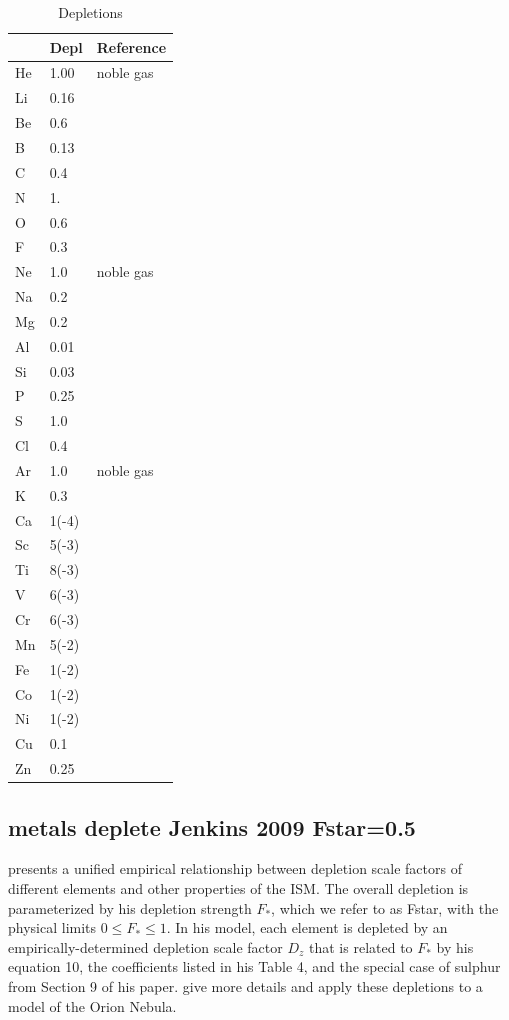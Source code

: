 \begin{table}
\centering
\caption{Depletions}
\label{tab:GrainGasDepletionFactors}
\begin{tabular}{lll}\hline
&Depl& Reference\\
\hline
He& 1.00& noble gas\\
Li& 0.16& \citealp{White1986}\\
Be& 0.6& \citealp{York1982}\\
B& 0.13& \citealp{Federman1993}\\
C& 0.4\\
N& 1.\\
O& 0.6\\
F& 0.3& \citealp{Snow1981}\\
Ne& 1.0& noble gas\\
Na& 0.2\\
Mg& 0.2\\
Al& 0.01\\
Si& 0.03\\
P& 0.25& \citealp{Cardelli1991}\\
S& 1.0\\
Cl& 0.4\\
Ar&1.0& noble gas\\
K& 0.3& \citealp{Chaffee1982}\\
Ca& 1(-4)\\
Sc& 5(-3)& \citealp{Snow1980}\\
Ti& 8(-3)& \citealp{Crinklaw1994}\\
V& 6(-3)& \citealp{Cardelli1994}\\
Cr& 6(-3)& \citealp{Cardelli1991}\\
Mn& 5(-2)& \citealp{Cardelli1991}\\
Fe& 1(-2)\\
Co& 1(-2)\\
Ni& 1(-2)\\
Cu& 0.1& \citealp{Cardelli1991}\\
Zn& 0.25& \citealp{Cardelli1991}\\
\hline
\end{tabular}
\end{table}

\subsection{metals deplete Jenkins 2009 Fstar=0.5}

\citet{2009ApJ...700.1299J} presents a unified empirical relationship between depletion
scale factors of different elements and other properties of the ISM.  
The overall depletion is parameterized by his depletion strength $F_*$, which we refer to as Fstar,
with the physical limits $0\leq F_* \leq 1$.
In his model, each element is depleted by an empirically-determined depletion scale factor $D_z$ that
is related to $F_*$ by his equation 10, the coefficients listed in his Table 4, 
and the special case of sulphur from Section 9 of his paper.
\citet{Gunasekera2022, Gunasekera2023} give more details and apply
these depletions to a model of the Orion Nebula.

